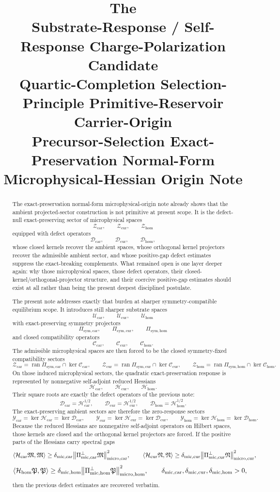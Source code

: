 \documentclass[11pt]{article}
\title{\textbf{The \TheoryName{}}\\[0.4em]
\large Substrate-Response / Self-Response Charge-Polarization Candidate\\
\large Quartic-Completion Selection-Principle Primitive-Reservoir Carrier-Origin\\
\large Precursor-Selection Exact-Preservation Normal-Form Microphysical-Hessian Origin Note}
\author{}
\date{}
\newcommand{\ProtoTensorClass}{\mathscr Y_{\mathrm{car}}}
\newcommand{\ProtoRelabelClass}{\mathscr Y_{\mathrm{cur}}}
\newcommand{\ProtoFreeClass}{\mathscr Y_{\mathrm{hom}}}
\newcommand{\UltraTensorClass}{\mathscr Z_{\mathrm{car}}}
\newcommand{\UltraRelabelClass}{\mathscr Z_{\mathrm{cur}}}
\newcommand{\UltraFreeClass}{\mathscr Z_{\mathrm{hom}}}
\newcommand{\UltraTensor}{\mathfrak M}
\newcommand{\UltraRelabel}{\mathfrak N}
\newcommand{\UltraFree}{\mathfrak P}
\newcommand{\UltraCarPerp}{\Pi_{\mathrm{mic,car}}^{\perp}}
\newcommand{\UltraCurPerp}{\Pi_{\mathrm{mic,cur}}^{\perp}}
\newcommand{\UltraHomPerp}{\Pi_{\mathrm{mic,hom}}^{\perp}}
\newcommand{\UltraCarGap}{\delta_{\mathrm{mic,car}}}
\newcommand{\UltraCurGap}{\delta_{\mathrm{mic,cur}}}
\newcommand{\UltraHomGap}{\delta_{\mathrm{mic,hom}}}
\newcommand{\TensorDefect}{\mathcal D_{\mathrm{car}}}
\newcommand{\CurDefect}{\mathcal D_{\mathrm{cur}}}
\newcommand{\HomDefect}{\mathcal D_{\mathrm{hom}}}
\newcommand{\RootTensorClass}{\mathscr U_{\mathrm{car}}}
\newcommand{\RootRelabelClass}{\mathscr U_{\mathrm{cur}}}
\newcommand{\RootFreeClass}{\mathscr U_{\mathrm{hom}}}
\newcommand{\TensorSymProj}{\Pi_{\mathrm{sym,car}}}
\newcommand{\CurSymProj}{\Pi_{\mathrm{sym,cur}}}
\newcommand{\HomSymProj}{\Pi_{\mathrm{sym,hom}}}
\newcommand{\TensorCompat}{\mathcal C_{\mathrm{car}}}
\newcommand{\CurCompat}{\mathcal C_{\mathrm{cur}}}
\newcommand{\HomCompat}{\mathcal C_{\mathrm{hom}}}
\newcommand{\TensorHess}{\mathcal H_{\mathrm{car}}}
\newcommand{\CurHess}{\mathcal H_{\mathrm{cur}}}
\newcommand{\HomHess}{\mathcal H_{\mathrm{hom}}}
\begin{document}
\maketitle

\begin{abstract}
The exact-preservation normal-form microphysical-origin note already shows that the ambient projected-sector construction is not primitive at present scope. It is the defect-null exact-preserving sector of microphysical spaces
\[
\UltraTensorClass,\qquad
\UltraRelabelClass,\qquad
\UltraFreeClass
\]
equipped with defect operators
\[
\TensorDefect,\qquad
\CurDefect,\qquad
\HomDefect,
\]
whose closed kernels recover the ambient spaces, whose orthogonal kernel projectors recover the admissible ambient sector, and whose positive-gap defect estimates suppress the exact-breaking complements. What remained open is one layer deeper again: why those microphysical spaces, those defect operators, their closed-kernel/orthogonal-projector structure, and their coercive positive-gap estimates should exist at all rather than being the present deepest disciplined postulate.

The present note addresses exactly that burden at sharper symmetry-compatible equilibrium scope. It introduces still sharper substrate spaces
\[
\RootTensorClass,\qquad
\RootRelabelClass,\qquad
\RootFreeClass
\]
with exact-preserving symmetry projectors
\[
\TensorSymProj,\qquad
\CurSymProj,\qquad
\HomSymProj
\]
and closed compatibility operators
\[
\TensorCompat,\qquad
\CurCompat,\qquad
\HomCompat.
\]
The admissible microphysical spaces are then forced to be the closed symmetry-fixed compatibility sectors
\[
\UltraTensorClass=\operatorname{ran}\TensorSymProj\cap\ker\TensorCompat,\qquad
\UltraRelabelClass=\operatorname{ran}\CurSymProj\cap\ker\CurCompat,\qquad
\UltraFreeClass=\operatorname{ran}\HomSymProj\cap\ker\HomCompat.
\]
On those induced microphysical sectors, the quadratic exact-preservation response is represented by nonnegative self-adjoint reduced Hessians
\[
\TensorHess,\qquad
\CurHess,\qquad
\HomHess.
\]
Their square roots are exactly the defect operators of the previous note:
\[
\TensorDefect=\TensorHess^{1/2},\qquad
\CurDefect=\CurHess^{1/2},\qquad
\HomDefect=\HomHess^{1/2}.
\]
The exact-preserving ambient sectors are therefore the zero-response sectors
\[
\ProtoTensorClass=\ker\TensorHess=\ker\TensorDefect,\qquad
\ProtoRelabelClass=\ker\CurHess=\ker\CurDefect,\qquad
\ProtoFreeClass=\ker\HomHess=\ker\HomDefect.
\]
Because the reduced Hessians are nonnegative self-adjoint operators on Hilbert spaces, those kernels are closed and the orthogonal kernel projectors are forced. If the positive parts of the Hessians carry spectral gaps
\[
\langle \TensorHess\UltraTensor,\UltraTensor\rangle
\ge
\UltraCarGap\norm{\UltraCarPerp\UltraTensor}_{\mathrm{micro,car}}^2,
\qquad
\langle \CurHess\UltraRelabel,\UltraRelabel\rangle
\ge
\UltraCurGap\norm{\UltraCurPerp\UltraRelabel}_{\mathrm{micro,cur}}^2,
\]
\[
\langle \HomHess\UltraFree,\UltraFree\rangle
\ge
\UltraHomGap\norm{\UltraHomPerp\UltraFree}_{\mathrm{micro,hom}}^2,
\qquad
\UltraCarGap,\UltraCurGap,\UltraHomGap>0,
\]
then the previous defect estimates are recovered verbatim.


\end{abstract}
\end{document}
